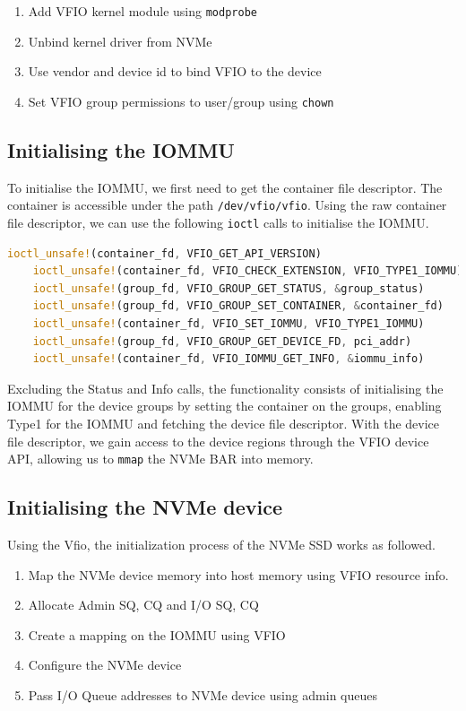\begin{enumerate}
    \item Add VFIO kernel module using \texttt{modprobe}
    \item Unbind kernel driver from NVMe
    \item Use vendor and device id to bind VFIO to the device
    \item Set VFIO group permissions to user/group using \texttt{chown}
\end{enumerate}

\subsection{Initialising the IOMMU}
To initialise the IOMMU, we first need to get the container file descriptor. The container is accessible under the path \texttt{/dev/vfio/vfio}. Using the raw container file descriptor, we can use the following \texttt{ioctl} calls to initialise the IOMMU.

\begin{lstlisting}[language=Rust, caption={ioctl calls needed for IOMMU initialization}, label=lst:containerioctls]
    ioctl_unsafe!(container_fd, VFIO_GET_API_VERSION)
    ioctl_unsafe!(container_fd, VFIO_CHECK_EXTENSION, VFIO_TYPE1_IOMMU)
    ioctl_unsafe!(group_fd, VFIO_GROUP_GET_STATUS, &group_status)
    ioctl_unsafe!(group_fd, VFIO_GROUP_SET_CONTAINER, &container_fd)
    ioctl_unsafe!(container_fd, VFIO_SET_IOMMU, VFIO_TYPE1_IOMMU)
    ioctl_unsafe!(group_fd, VFIO_GROUP_GET_DEVICE_FD, pci_addr)
    ioctl_unsafe!(container_fd, VFIO_IOMMU_GET_INFO, &iommu_info)   
\end{lstlisting}

Excluding the Status and Info calls, the functionality consists of initialising the IOMMU for the device groups by setting the container on the groups, enabling Type1 for the IOMMU and fetching the device file descriptor. With the device file descriptor, we gain access to the device regions through the VFIO device API, allowing us to \texttt{mmap} the NVMe BAR into memory.

\subsection{Initialising the NVMe device}
Using the Vfio, the initialization process of the NVMe SSD works as followed.

\begin{enumerate}
    \item Map the NVMe device memory into host memory using VFIO resource info.
    \item Allocate Admin SQ, CQ and I/O SQ, CQ
    \item Create a mapping on the IOMMU using VFIO
    \item Configure the NVMe device
    \item Pass I/O Queue addresses to NVMe device using admin queues
\end{enumerate}

